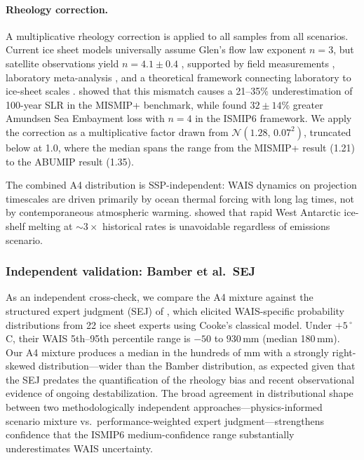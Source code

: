 \documentclass[11pt]{article}
\begin{document}
\paragraph{Rheology correction.}
A multiplicative rheology correction is applied to all samples from all scenarios. Current ice sheet models universally assume Glen's flow law exponent $n = 3$, but satellite observations yield $n = 4.1 \pm 0.4$ \citep{Millstein2022}, supported by field measurements \citep{Bons2018}, laboratory meta-analysis \citep{Fan2025}, and a theoretical framework connecting laboratory to ice-sheet scales \citep{Ranganathan2024}. \citet{Martin2026} showed that this mismatch causes a 21--35\% underestimation of 100-year SLR in the MISMIP+ benchmark, while \citet{GetraerMorlighem2025} found $32 \pm 14\%$ greater Amundsen Sea Embayment loss with $n = 4$ in the ISMIP6 framework. We apply the correction as a multiplicative factor drawn from $\mathcal{N}(1.28,\, 0.07^2)$, truncated below at 1.0, where the median spans the range from the MISMIP+ result (1.21) to the ABUMIP result (1.35).

The combined A4 distribution is SSP-independent: WAIS dynamics on projection timescales are driven primarily by ocean thermal forcing with long lag times, not by contemporaneous atmospheric warming. \citet{Naughten2023} showed that rapid West Antarctic ice-shelf melting at $\sim\!3\times$ historical rates is unavoidable regardless of emissions scenario.

\subsubsection{Independent validation: Bamber et al.\ SEJ}

As an independent cross-check, we compare the A4 mixture against the structured expert judgment (SEJ) of \citet{Bamber2019}, which elicited WAIS-specific probability distributions from 22 ice sheet experts using Cooke's classical model. Under $+5\,^\circ$C, their WAIS 5th--95th percentile range is $-50$ to $930$\,mm (median 180\,mm). Our A4 mixture produces a median in the hundreds of mm with a strongly right-skewed distribution---wider than the Bamber distribution, as expected given that the SEJ predates the quantification of the rheology bias \citep{Martin2026} and recent observational evidence of ongoing destabilization. The broad agreement in distributional shape between two methodologically independent approaches---physics-informed scenario mixture vs.\ performance-weighted expert judgment---strengthens confidence that the ISMIP6 medium-confidence range substantially underestimates WAIS uncertainty.
\end{document}
